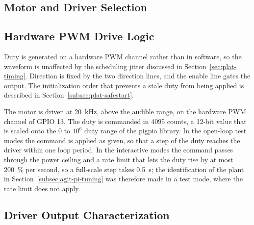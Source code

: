 \subsection{Motor and Driver Selection}
\label{subsec:agit-motor-sel}


\subsection{Hardware PWM Drive Logic}
\label{subsec:agit-pwm}

Duty is generated on a hardware PWM channel rather than in software, so the waveform is unaffected by the scheduling jitter discussed in Section~\ref{sec:plat-timing}. Direction is fixed by the two direction lines, and the enable line gates the output. The initialization order that prevents a stale duty from being applied is described in Section~\ref{subsec:plat-safestart}.

The motor is driven at 20~kHz, above the audible range, on the hardware PWM channel of GPIO 13. The duty is commanded in 4095 counts, a 12-bit value that is scaled onto the 0 to $10^6$ duty range of the pigpio library. In the open-loop test modes the command is applied as given, so that a step of the duty reaches the driver within one loop period. In the interactive modes the command passes through the power ceiling and a rate limit that lets the duty rise by at most 200~\% per second, so a full-scale step takes 0.5~s; the identification of the plant in Section~\ref{subsec:agit-pi-tuning} was therefore made in a test mode, where the rate limit does not apply.


\subsection{Driver Output Characterization}
\label{subsec:agit-driver-test}

